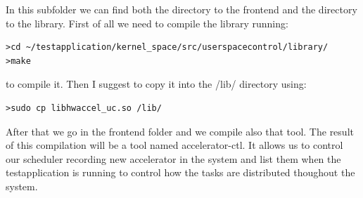 \documentclass[a4paper,13pt]{article}
\begin{document}
\begin{multicols}{2}
\begin{itemize}
    \end{itemize}
    \vspace{-2ex}
        In this subfolder we can find both the directory to the frontend and the directory to the library. First of 
        all we need to compile the library running:
\begin{lstlisting}
>cd ~/testapplication/kernel_space/src/userspacecontrol/library/
>make
\end{lstlisting}
        to compile it. Then I suggest to copy it into the /lib/ directory using:
\begin{lstlisting}
>sudo cp libhwaccel_uc.so /lib/
\end{lstlisting}
        After that we go in the frontend folder and we compile also that tool.
        The result of this compilation will be a tool named accelerator-ctl. It allows us to control our scheduler
        recording new accelerator in the system and list them when the testapplication is running to control
        how the tasks are distributed thoughout the system.








\end{multicols}
\end{document}
